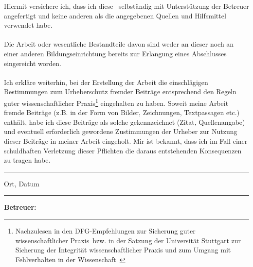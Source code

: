 \thispagestyle{empty}
Hiermit versichere ich, dass ich diese \ifrtype~selbständig mit Unterstützung der Betreuer angefertigt und keine anderen als die angegebenen Quellen und Hilfsmittel verwendet habe.\\
\ \\
Die Arbeit oder wesentliche Bestandteile davon sind weder an dieser noch an einer anderen Bildungseinrichtung bereits zur Erlangung eines Abschlusses eingereicht worden.\\
\ \\
Ich erkläre weiterhin, bei der Erstellung der Arbeit die einschlägigen Bestimmungen zum Urheberschutz fremder Beiträge entsprechend den Regeln guter wissenschaftlicher Praxis\footnote{Nachzulesen in den DFG-Empfehlungen zur \glqq Sicherung guter wissenschaftlicher Praxis\grqq~bzw. in der Satzung der Universität Stuttgart zur \grqq Sicherung der Integrität wissenschaftlicher Praxis und zum Umgang mit Fehlverhalten in der Wissenschaft\grqq~} eingehalten zu haben. Soweit meine Arbeit fremde Beiträge (z.B. in der Form von Bilder, Zeichnungen, Textpassagen etc.) enthält, habe ich diese Beiträge als solche gekennzeichnet (Zitat, Quellenangabe) und eventuell erforderlich gewordene Zustimmungen der Urheber zur Nutzung dieser Beiträge in meiner Arbeit eingeholt. Mir ist bekannt, dass ich im Fall einer schuldhaften Verletzung dieser Pflichten die daraus entstehenden Konsequenzen zu tragen habe.\\[2cm]
\parbox{8cm}{
\hrule
\strut \centering\footnotesize Ort, Datum}
\hfill
\parbox{6cm}{
\hrule
\strut \centering\footnotesize \ifrauthor}
\vfill 
\textbf{Betreuer: \ifrsupervisor}